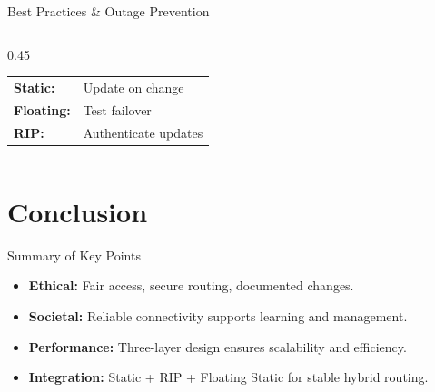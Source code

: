 \documentclass[aspectratio=169]{beamer}
\begin{document}
\begin{frame}{Best Practices \& Outage Prevention}
\begin{columns}[T,onlytextwidth]
\begin{column}{0.45\textwidth}

\vspace{2mm}
\footnotesize
\begin{tabular}{@{}>{\bfseries}l l@{}}
Static:   & Update on change \\
Floating: & Test failover \\
RIP:      & Authenticate updates \\
\end{tabular}
\end{column}

\end{columns}
\end{frame}

\section{Conclusion}
\begin{frame}{Summary of Key Points}
\begin{itemize}
    \item \textbf{Ethical:} Fair access, secure routing, documented changes.
    \vspace{4pt}
    \item \textbf{Societal:} Reliable connectivity supports learning and management.
    \vspace{4pt}
    \item \textbf{Performance:} Three-layer design ensures scalability and efficiency.
    \vspace{4pt}
    \item \textbf{Integration:} Static + RIP + Floating Static for stable hybrid routing.
\end{itemize}
\end{frame}
\end{document}
